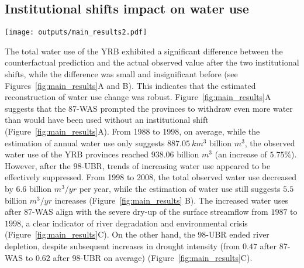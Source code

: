\documentclass[preprint, 12pt]{elsarticle}
\begin{document}
\subsection{Institutional shifts impact on water use}\label{result-2}


\begin{figure*}[!htb]
	\centering
	\texttt{[image: outputs/main\_results2.pdf]}
	\caption{
	Effects of two institutional shifts on water resources use and allocation in the Yellow River Basin (YRB).
	\textbf{A.} Water uses of the YRB before and after the institutional shift in 1987 (87-WAS);
	\textbf{B.} Water uses of the YRB before and after the institutional shift in 1998 (98-UBR). Blue lines are statistics derived from water use data; grey lines are estimates from the Differenced Synthetic Control method with economic and environmental background controlled;
	\textbf{C.} Drought intensity in the YRB and drying up events of the Yellow River. The size of the grey bubbles denotes the length of drying upstream.
	}\label{fig:main_results}
\end{figure*}

The total water use of the YRB exhibited a significant difference between the counterfactual prediction and the actual observed value after the two institutional shifts, while the difference was small and insignificant before (see Figures~\ref{fig:main_results}A and B). This indicates that the estimated reconstruction of water use change was robust.
Figure~\ref{fig:main_results}A suggests that the 87-WAS prompted the provinces to withdraw even more water than would have been used without an institutional shift (Figure~\ref{fig:main_results}A).
From 1988 to 1998, on average, while the estimation of annual water use only suggests $887.05~km^3$ billion $m^3$, the observed water use of the YRB provinces reached $938.06$ billion $m^3$ (an increase of $5.75\%$).
However, after the 98-UBR, trends of increasing water use appeared to be effectively suppressed.
From 1998 to 2008, the total observed water use decreased by $6.6$ billion $m^3/yr$ per year, while the estimation of water use still suggests $5.5$ billion $m^3/yr$ increases (Figure~\ref{fig:main_results} B).
The increased water uses after 87-WAS align with the severe dry-up of the surface streamflow from $1987$ to $1998$, a clear indicator of river degradation and environmental crisis (Figure~\ref{fig:main_results}C).
On the other hand, the 98-UBR ended river depletion, despite subsequent increases in drought intensity (from $0.47$ after 87-WAS to $0.62$ after 98-UBR on average) (Figure~\ref{fig:main_results}C).
\end{document}
